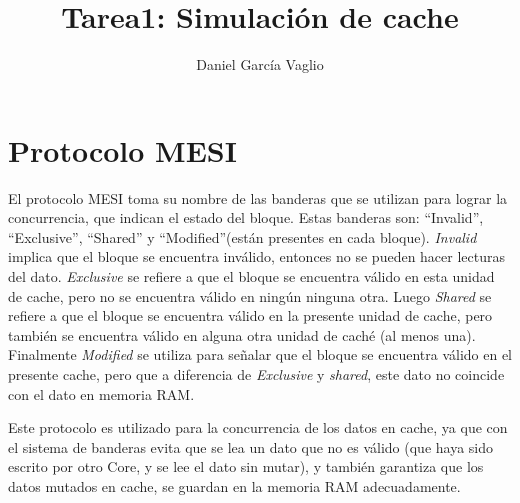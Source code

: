 \documentclass {article}
\begin{document}
\title{Tarea1: Simulación de cache}
\author{Daniel García Vaglio}
\maketitle



\section{Protocolo MESI}
El protocolo MESI toma su nombre de las banderas que se utilizan para lograr la concurrencia, que
indican el estado del bloque. Estas banderas son: ``Invalid'', ``Exclusive'', ``Shared'' y
``Modified''(están presentes en cada bloque). \textit{Invalid} implica que el bloque se encuentra inválido, entonces no se pueden hacer
lecturas del dato. \textit{Exclusive} se refiere a que el bloque se encuentra válido en esta unidad de cache,
pero no se encuentra válido en ningún ninguna otra. Luego \textit{Shared} se refiere a que el bloque se
encuentra válido en la presente unidad de cache, pero también se encuentra válido en alguna otra
unidad de caché (al menos una). Finalmente \textit{Modified} se utiliza para señalar que el bloque se
encuentra válido en el presente cache, pero que a diferencia de \textit{Exclusive} y \textit{shared}, este dato no
coincide con el dato en memoria RAM.

Este protocolo es utilizado para la concurrencia de los datos en cache, ya que con el sistema de
banderas evita que se lea un dato que no es válido (que haya sido escrito por otro Core, y se lee el
dato sin mutar), y también garantiza que los datos mutados en cache, se guardan en la memoria RAM
adecuadamente.
\end{document}
